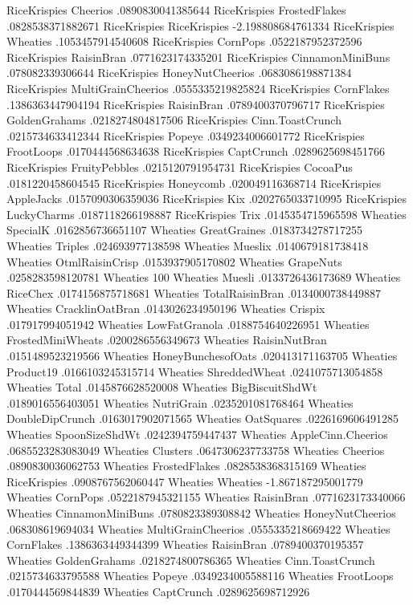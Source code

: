 RiceKrispies	Cheerios	.0890830041385644
RiceKrispies	FrostedFlakes	.0828538371882671
RiceKrispies	RiceKrispies	-2.198808684761334
RiceKrispies	Wheaties	.1053457914540608
RiceKrispies	CornPops	.0522187952372596
RiceKrispies	RaisinBran	.0771623174335201
RiceKrispies	CinnamonMiniBuns	.078082339306644
RiceKrispies	HoneyNutCheerios	.0683086198871384
RiceKrispies	MultiGrainCheerios	.0555335219825824
RiceKrispies	CornFlakes	.1386363447904194
RiceKrispies	RaisinBran	.0789400370796717
RiceKrispies	GoldenGrahams	.0218274804817506
RiceKrispies	Cinn.ToastCrunch	.0215734633412344
RiceKrispies	Popeye	.0349234006601772
RiceKrispies	FrootLoops	.0170444568634638
RiceKrispies	CaptCrunch	.0289625698451766
RiceKrispies	FruityPebbles	.0215120791954731
RiceKrispies	CocoaPus	.0181220458604545
RiceKrispies	Honeycomb	.020049116368714
RiceKrispies	AppleJacks	.0157090306359036
RiceKrispies	Kix	.0202765033710995
RiceKrispies	LuckyCharms	.0187118266198887
RiceKrispies	Trix	.0145354715965598
Wheaties	SpecialK	.0162856736651107
Wheaties	GreatGraines	.0183734278717255
Wheaties	Triples	.024693977138598
Wheaties	Mueslix	.0140679181738418
Wheaties	OtmlRaisinCrisp	.0153937905170802
Wheaties	GrapeNuts	.0258283598120781
Wheaties	100%
Wheaties	Muesli	.0133726436173689
Wheaties	RiceChex	.0174156875718681
Wheaties	TotalRaisinBran	.0134000738449887
Wheaties	CracklinOatBran	.0143026234950196
Wheaties	Crispix	.017917994051942
Wheaties	LowFatGranola	.0188754640226951
Wheaties	FrostedMiniWheats	.0200286556349673
Wheaties	RaisinNutBran	.0151489523219566
Wheaties	HoneyBunchesofOats	.020413171163705
Wheaties	Product19	.0166103245315714
Wheaties	ShreddedWheat	.0241075713054858
Wheaties	Total	.0145876628520008
Wheaties	BigBiscuitShdWt	.0189016556403051
Wheaties	NutriGrain	.0235201081768464
Wheaties	DoubleDipCrunch	.0163017902071565
Wheaties	OatSquares	.0226169606491285
Wheaties	SpoonSizeShdWt	.0242394759447437
Wheaties	AppleCinn.Cheerios	.0685523283083049
Wheaties	Clusters	.0647306237733758
Wheaties	Cheerios	.0890830036062753
Wheaties	FrostedFlakes	.0828538368315169
Wheaties	RiceKrispies	.0908767562060447
Wheaties	Wheaties	-1.867187295001779
Wheaties	CornPops	.0522187945321155
Wheaties	RaisinBran	.0771623173340066
Wheaties	CinnamonMiniBuns	.0780823389308842
Wheaties	HoneyNutCheerios	.068308619694034
Wheaties	MultiGrainCheerios	.0555335218669422
Wheaties	CornFlakes	.1386363449344399
Wheaties	RaisinBran	.0789400370195357
Wheaties	GoldenGrahams	.0218274800786365
Wheaties	Cinn.ToastCrunch	.0215734633795588
Wheaties	Popeye	.0349234005588116
Wheaties	FrootLoops	.0170444569844839
Wheaties	CaptCrunch	.0289625698712926
